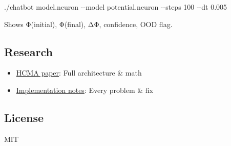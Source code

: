 \documentclass[
  11pt,
  a4paper,
]{article}
\newenvironment{Shaded}{\begin{snugshade}}{\end{snugshade}}
\newcommand{\AttributeTok}[1]{\textcolor[rgb]{0.13,0.29,0.53}{#1}}
\newcommand{\ExtensionTok}[1]{#1}
\newcommand{\NormalTok}[1]{#1}
\providecommand{\tightlist}{%
  \setlength{\itemsep}{0pt}\setlength{\parskip}{0pt}}
\begin{document}
\begin{Shaded}
\begin{Highlighting}[]
\ExtensionTok{./chatbot}\NormalTok{ model.neuron }\AttributeTok{{-}{-}model}\NormalTok{ potential.neuron }\AttributeTok{{-}{-}steps}\NormalTok{ 100 }\AttributeTok{{-}{-}dt}\NormalTok{ 0.005}
\end{Highlighting}
\end{Shaded}

Shows Φ(initial), Φ(final), ΔΦ, confidence, OOD flag.

\subsection{Research}\label{research}

\begin{itemize}
\tightlist
\item
  \href{research-paper/hcma.md}{HCMA paper}: Full architecture \& math
\item
  \href{contributing/how_we_implement.md}{Implementation notes}: Every
  problem \& fix
\end{itemize}

\subsection{License}\label{license}

MIT
\end{document}
